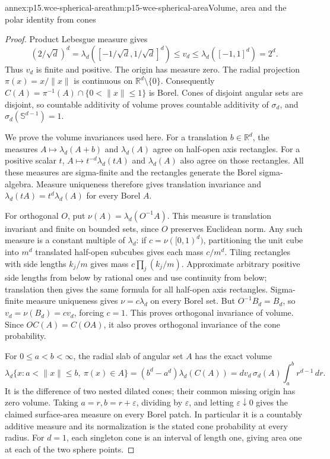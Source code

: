 \begin{annexitem}{annex:p15.wce-spherical-area}{thm:p15-wce-spherical-area}{Volume, area and the polar identity from cones}
\begin{proof}
Product Lebesgue measure gives
\[
 (2/\sqrt d)^d
   =\lambda_d([-1/\sqrt d,1/\sqrt d]^d)
   \leq v_d\leq\lambda_d([-1,1]^d)=2^d.
 \]
Thus \(v_d\) is finite and positive. The origin has measure zero.
The radial projection \(\pi(x)=x/\|x\|\) is continuous on
\(\mathbb R^d\setminus\{0\}\).
Consequently \(C(A)=\pi^{-1}(A)\cap\{0<\|x\|\leq1\}\)
is Borel. Cones of disjoint angular sets are disjoint, so
countable additivity of volume proves countable additivity
of \(\sigma_d\), and \(\sigma_d(\mathbb S^{d-1})=1\).

We prove the volume invariances used here.
For a translation \(b\in\mathbb R^d\), the measures
\(A\mapsto\lambda_d(A+b)\) and \(\lambda_d(A)\) agree on
half-open axis rectangles. For a positive scalar \(t\),
\(A\mapsto t^{-d}\lambda_d(tA)\) and \(\lambda_d(A)\)
also agree on those rectangles. All these measures are
sigma-finite and the rectangles generate the Borel sigma-algebra.
Measure uniqueness therefore gives translation invariance and
\(\lambda_d(tA)=t^d\lambda_d(A)\) for every Borel \(A\).

For orthogonal \(O\), put \(\nu(A)=\lambda_d(O^{-1}A)\).
This measure is translation invariant and finite on bounded sets,
since \(O\) preserves Euclidean norm.
Any such measure is a constant multiple of \(\lambda_d\):
if \(c=\nu([0,1)^d)\), partitioning the unit cube into
\(m^d\) translated half-open subcubes gives each mass \(c/m^d\).
Tiling rectangles with side lengths \(k_j/m\) gives mass
\(c\prod_j(k_j/m)\). Approximate arbitrary positive side lengths
from below by rational ones and use continuity from below;
translation then gives the same formula for all half-open
axis rectangles. Sigma-finite measure uniqueness gives
\(\nu=c\lambda_d\) on every Borel set.
But \(O^{-1}B_d=B_d\), so
\(v_d=\nu(B_d)=cv_d\), forcing \(c=1\).
This proves orthogonal invariance of volume.
Since \(O C(A)=C(OA)\), it also proves orthogonal invariance
of the cone probability.

For \(0\leq a<b<\infty\), the radial slab of angular set
\(A\) has the exact volume
\[
 \lambda_d\{x:a<\|x\|\leq b,\ \pi(x)\in A\}
   =(b^d-a^d)\lambda_d(C(A))
   =d v_d\,\sigma_d(A)\int_a^b r^{d-1}\,dr.
 \]
It is the difference of two nested dilated cones;
their common missing origin has zero volume.
Taking \(a=r,b=r+\varepsilon\), dividing by
\(\varepsilon\), and letting \(\varepsilon\downarrow0\)
gives the claimed surface-area measure on every Borel patch.
In particular it is a countably additive measure and its
normalization is the stated cone probability at every radius.
For \(d=1\), each singleton cone is an interval of length one,
giving area one at each of the two sphere points.


\end{proof}
\end{annexitem}
